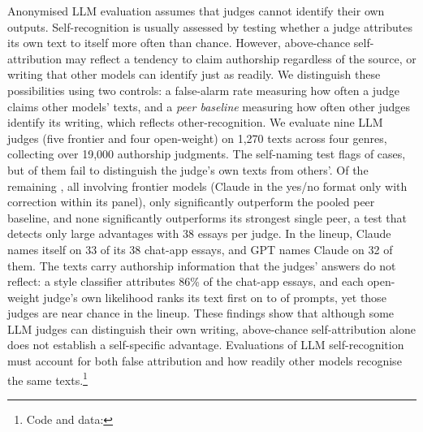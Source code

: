 Anonymised LLM evaluation assumes that judges cannot identify their own
outputs. Self-recognition is usually assessed by testing whether a judge
attributes its own text to itself more often than chance. However,
above-chance self-attribution may reflect a tendency to claim authorship
regardless of the source, or writing that other models can identify just as
readily. We distinguish these possibilities using two controls: a false-alarm
rate measuring how often a judge claims other models' texts, and a
\emph{peer baseline} measuring how often other judges identify its writing,
which reflects other-recognition. We evaluate nine LLM judges (five frontier
and four open-weight) on 1,270 texts across four genres, collecting over
19,000 authorship judgments. The self-naming test flags \CVflagged{} of
\CVcells{} cases, but \CVfailFA{} of them fail to distinguish the judge's own
texts from others'. Of the remaining \CVdisc{}, all involving frontier models
(Claude in the yes/no format only with correction within its panel), only
\CVbothAttr{} significantly outperform the pooled peer baseline, and none
significantly outperforms its strongest single peer, a test that detects only
large advantages with 38 essays per judge. In the lineup,
Claude names itself on 33 of its 38 chat-app essays, and GPT names Claude on
32 of them. The texts carry authorship information that the judges' answers
do not reflect: a style classifier attributes 86\% of the chat-app essays, and
each open-weight judge's own likelihood ranks its text first on
\OWLikUncRawMin{} to \OWLikUncRawMax{} of prompts, yet those judges are near
chance in the lineup. These findings show that although some LLM judges can
distinguish their own writing, above-chance self-attribution alone does not
establish a self-specific advantage. Evaluations of LLM
self-recognition must account for both false attribution and how readily
other models recognise the same texts.\footnote{Code and data: \CodeURL}
